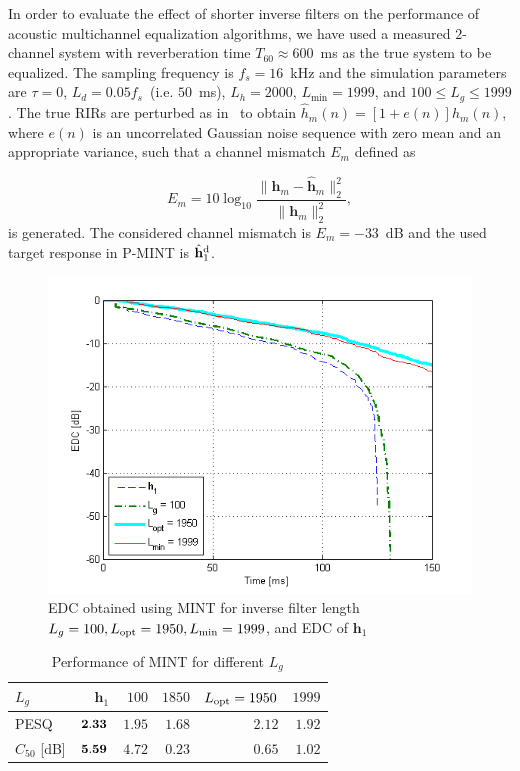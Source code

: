 \documentclass{article}
\begin{document}
In order to evaluate the effect of shorter inverse filters on the performance of acoustic multichannel equalization algorithms, we have used a measured $2$-channel system with reverberation time $T_{60} \approx 600$~ms as the true system to be equalized. 
The sampling frequency is $f_s = 16$~kHz and the simulation parameters are $\tau = 0$, $L_d = 0.05 f_s$~(i.e. $50$~ms), $L_h = 2000$, $L_{\min} = 1999$, and $100 \leq L_g \leq 1999$.
The true RIRs are perturbed as in~\cite{Cho_ITSA_1999} to obtain $\hat{h}_m(n) = [1 + e(n)] h_m(n)$, where $e(n)$ is an uncorrelated Gaussian noise sequence with zero mean and an appropriate variance, such that a channel mismatch $E_m$ defined as

\begin{equation}
  E_m = 10 \log_{10} \frac{\|\mathbf{h}_m-\hat{\mathbf{h}}_m\|_2^2}{\|\mathbf{h}_m\|_2^2},
\end{equation}
is generated.
The considered channel mismatch is $E_m = -33$~dB and the used target response in P-MINT is $\hat{\mathbf{h}}_1^{\rm d}$.
\begin{figure}[t!]
\includegraphics[scale=0.6]{EUSIPCOplots/EDC_mint_vs_Lg_sys_5_Cm_-33}
  \vspace{-0.6cm}
\caption{EDC obtained using MINT for inverse filter length $L_g = 100, L_{\rm opt} = 1950, L_{\min} = 1999$, and EDC of $\mathbf{h}_1$}
\label{fig: EDC_mint}
\vspace{-0.5cm}
\end{figure}
\begin{table}[t!]
\footnotesize
\centering
\caption{Performance of MINT for different $L_g$}
\label{tbl: mint}
 \begin{tabular}{|l|r|r|r|r|r|}
   \hline
   $L_g$ & $\mathbf{h}_1$ & $100$ & $1850$ & $L_{\rm opt} = 1950$ & $1999$ \\ \hline
   PESQ & $\bf{2.33}$ & $1.95$ & $1.68$ & $2.12$ & $1.92$ \\ \hline
   $C_{50}$ [dB] & $\bf{5.59}$ & $4.72$ & $0.23$ & $0.65$ & $1.02$ \\ \hline
\end{tabular}
\vspace{-0.1cm}
\end{table}
\end{document}

